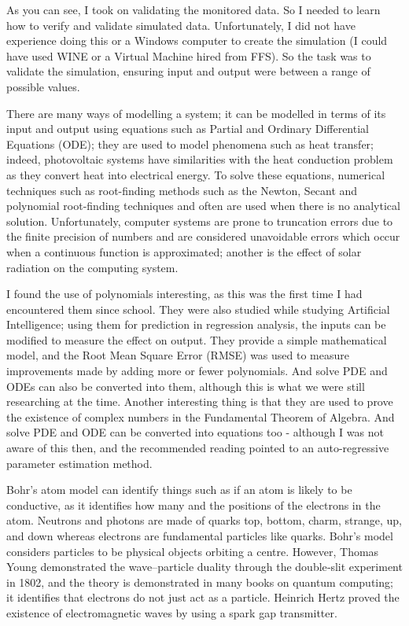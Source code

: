 \documentclass{article}
\begin{document}
As you can see, I took on validating the monitored data. So I needed to learn how to verify and validate simulated data. Unfortunately, I did not have experience doing this or a Windows computer to create the simulation (I could have used WINE or a Virtual Machine hired from FFS). So the task was to validate the simulation, ensuring input and output were between a range of possible values. 

There are many ways of modelling a system; it can be modelled in terms of its input and output using equations such as Partial and Ordinary Differential Equations (ODE); they are used to model phenomena such as heat transfer; indeed, photovoltaic systems have similarities with the heat conduction problem as they convert heat into electrical energy. To solve these equations, numerical techniques such as root-finding methods such as the Newton, Secant and polynomial root-finding techniques and often are used when there is no analytical solution. Unfortunately, computer systems are prone to truncation errors due to the finite precision of numbers and are considered unavoidable errors which occur when a continuous function is approximated; another is the effect of solar radiation on the computing system. 

I found the use of polynomials interesting, as this was the first time I had encountered them since school. They were also studied while studying Artificial Intelligence; using them for prediction in regression analysis, the inputs can be modified to measure the effect on output. They provide a simple mathematical model, and the Root Mean Square Error (RMSE) was used to measure improvements made by adding more or fewer polynomials. And solve PDE and ODEs can also be converted into them, although this is what we were still researching at the time. Another interesting thing is that they are used to prove the existence of complex numbers in the Fundamental Theorem of Algebra. And solve PDE and ODE can be converted into equations too - although I was not aware of this then, and the recommended reading pointed to an auto-regressive parameter estimation method.

Bohr's atom model can identify things such as if an atom is likely to be conductive, as it identifies how many and the positions of the electrons in the atom. Neutrons and photons are made of quarks top, bottom, charm, strange, up, and down whereas electrons are fundamental particles like quarks. Bohr's model considers particles to be physical objects orbiting a centre. However, Thomas Young demonstrated the wave–particle duality through the double‐slit experiment in 1802, and the theory is demonstrated in many books on quantum computing; it identifies that electrons do not just act as a particle. Heinrich Hertz proved the existence of electromagnetic waves by using a spark gap transmitter. 
\end{document}
